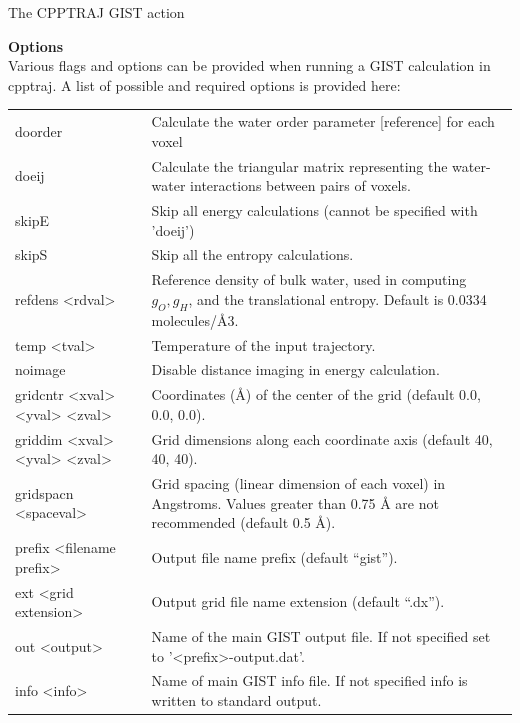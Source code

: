\documentclass[9pt,tutorial]{livecoms}
\begin{document}
\begin{Checklists*}
	
\begin{checklist}{The CPPTRAJ GIST action}

\textbf{Options}\\
Various flags and options can be provided when running a GIST calculation in 
cpptraj. A list of possible and required options is provided here:

\begin{tabular}{@{}l p{}@{}}
\toprule
doorder & Calculate the water order parameter [reference] for each voxel\\
doeij & Calculate the triangular matrix representing the water-water 
interactions between pairs of voxels.\\
skipE & Skip all energy calculations (cannot be specified with ’doeij’)\\
skipS & Skip all the entropy calculations.\\
refdens <rdval> & Reference density of bulk water, used in computing 
$g_O, g_H$, and the translational entropy. Default is 0.0334 molecules/Å3. \\
temp <tval> & Temperature of the input trajectory. \\
noimage &  Disable distance imaging in energy calculation. \\
gridcntr <xval> <yval> <zval> & Coordinates (Å) of the center of the grid 
(default 0.0, 0.0, 0.0). \\
griddim <xval> <yval> <zval> & Grid dimensions along each coordinate axis 
(default 40, 40, 40).\\
gridspacn <spaceval> & Grid spacing (linear dimension of each voxel) in 
Angstroms. Values greater than 0.75 Å are not recommended (default 0.5 Å).\\
prefix <filename prefix> & Output file name prefix (default “gist”).\\
ext <grid extension> & Output grid file name extension (default “.dx”). \\
out <output> & Name of the main GIST output file. If not specified set to 
’<prefix>-output.dat’.\\
info <info> & Name of main GIST info file. If not specified info is 
written to standard output. \\
\bottomrule
\end{tabular}



\end{checklist}
\end{Checklists*}
\end{document}
